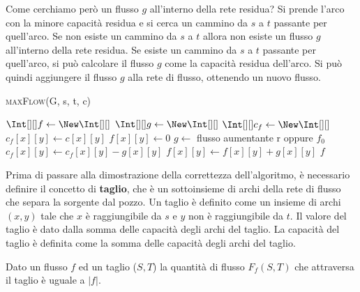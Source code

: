         Come cerchiamo però un flusso $g$ all'interno della rete residua? Si prende l'arco con la minore capacità residua e si cerca un cammino da $s$ a $t$ passante per quell'arco. Se non esiste un cammino da $s$ a $t$ allora non esiste un flusso $g$ all'interno della rete residua. Se esiste un cammino da $s$ a $t$ passante per quell'arco, si può calcolare il flusso $g$ come la capacità residua dell'arco. Si può quindi aggiungere il flusso $g$ alla rete di flusso, ottenendo un nuovo flusso.
        \begin{algorithm}
            \caption{\Int[][] \textsc{maxFlow}(\Graph G, \Node s, \Node t, \Int[][] c)}
            \label{alg:maxFlow}
            \begin{algorithmic}
                \State $\Int[][] f \gets \New \Int[][]$
                \State $\Int[][] g \gets \New \Int[][]$
                \State $\Int[][] c_f \gets \New \Int[][]$
                    \State $c_f[x][y] \gets c[x][y]$
                    \State $f[x][y] \gets 0$
                \EndFor
                    \State $g \gets$ flusso aumentante r oppure $f_0$
                        \State $c_f[x][y] \gets c_f[x][y] - g[x][y]$
                        \State $f[x][y] \gets f[x][y] + g[x][y]$
                    \EndFor
                \EndWhile
                \State \Return $f$
            \end{algorithmic}
        \end{algorithm}
        Prima di passare alla dimostrazione della correttezza dell'algoritmo, è necessario definire il concetto di \textbf{taglio}, che è un sottoinsieme di archi della rete di flusso che separa la sorgente dal pozzo. Un taglio è definito come un insieme di archi $(x,y)$ tale che $x$ è raggiungibile da $s$ e $y$ non è raggiungibile da $t$. Il valore del taglio è dato dalla somma delle capacità degli archi del taglio. La capacità del taglio è definita come la somma delle capacità degli archi del taglio. 
        \begin{theorem}
            Dato un flusso $f$ ed un taglio ($S,T$) la quantità di flusso $F_f(S,T)$ che attraversa il taglio è uguale a $|f|$.
        \end{theorem}
